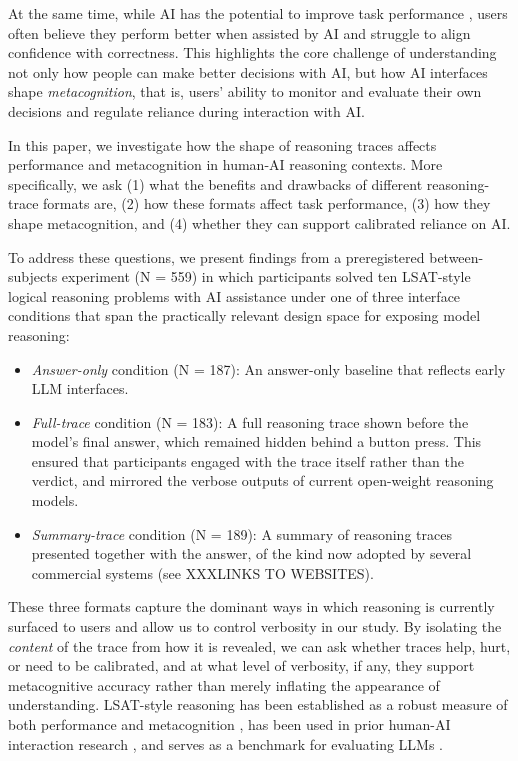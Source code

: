 \documentclass[acmlarge,review=true, anonymous=true]{acmart}
\begin{document}
At the same time, while AI has the potential to improve task performance \cite{10.1145/3411764.3445717, steyvers_bayesian_2022,zulfikar_memoro_2024}, users often believe they perform better when assisted by AI \cite{FERNANDES2026108779, kloft2023ai, villa2023placebo} and struggle to align confidence with correctness. This highlights the core challenge of understanding not only how people can make better decisions with AI, but how AI interfaces shape \textit{metacognition}, that is, users' ability to monitor and evaluate their own decisions and regulate reliance during interaction with AI.


In this paper, we investigate how the shape of reasoning traces affects performance and metacognition in human-AI reasoning contexts. %
More specifically, we ask (1) what the benefits and drawbacks of different reasoning-trace formats are, (2) how these formats affect task performance, (3) how they shape metacognition, and (4) whether they can support calibrated reliance on AI. 

To address these questions, we present findings from a preregistered between-subjects experiment (N = 559) in which participants solved ten LSAT-style logical reasoning problems with AI assistance under one of three interface conditions that span the practically relevant design space for exposing model reasoning: 
\begin{itemize}
    \item \textit{Answer-only} condition (N = 187): An answer-only baseline that reflects early LLM interfaces.
    \item \textit{Full-trace} condition (N = 183): A full reasoning trace shown before the model's final answer, which remained hidden behind a button press. This ensured that participants engaged with the trace itself rather than the verdict, and mirrored the verbose outputs of current open-weight reasoning models.
    \item \textit{Summary-trace} condition (N = 189): A summary of reasoning traces presented together with the answer, of the kind now adopted by several commercial systems (see XXXLINKS TO WEBSITES). 
\end{itemize}

These three formats capture the dominant ways in which reasoning is currently surfaced to users and allow us to control verbosity in our study. By isolating the \textit{content} of the trace from how it is revealed, we can ask whether traces help, hurt, or need to be calibrated, and at what level of verbosity, if any, they support metacognitive accuracy rather than merely inflating the appearance of understanding. LSAT-style reasoning has been established as a robust measure of both performance and metacognition \cite{vaccaro2024combinations}, has been used in prior human-AI interaction research \cite{FERNANDES2026108779}, and serves as a benchmark for evaluating LLMs \cite{katz2024gpt}. 
\end{document}
